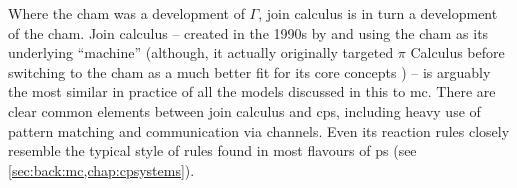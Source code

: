 

Where the \gls{cham} was a development of \(\Gamma\), join calculus is in turn a development of the \gls{cham}.  Join calculus -- created in the 1990s by \citeauthor{Fournet1996} \cite{Fournet1996,Fournet2002} and using the \gls{cham} as its underlying ``machine'' (although, it actually originally targeted \(\pi\) Calculus before switching to the \gls{cham} as a much better fit for its core concepts \cite{Fournet2002}) -- is arguably the most similar in practice of all the models discussed in this  to \gls{mc}.  There are clear common elements between join calculus and \gls{cps}, including heavy use of pattern matching and communication via channels.  Even its reaction rules closely resemble the typical style of rules found in most flavours of \gls{ps} (see \cref{sec:back:mc,chap:cpsystems}).%

